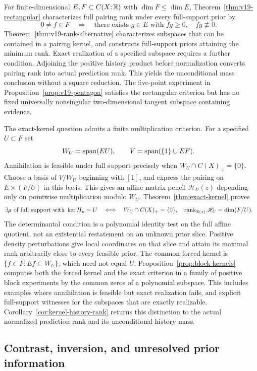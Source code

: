 For finite-dimensional $E,F\subset C(X;\mathbb R)$ with $\dim F\le\dim E$,
Theorem~\ref{thm:v19-rectangular} characterizes full pairing rank
under every full-support prior by
\[
 0\ne f\in F\quad\Longrightarrow\quad
 \text{there exists }g\in E\text{ with }fg\ge0,\quad fg\not\equiv0.
\]
Theorem~\ref{thm:v19-rank-alternative} characterizes subspaces that
can be contained in a pairing kernel, and constructs full-support priors
attaining the minimum rank. Exact realization of a specified subspace
requires a further condition.
Adjoining the positive history product before normalization converts
pairing rank into actual prediction rank. This yields the unconditional
mass conclusion without a square reduction. The five-point experiment
in Proposition~\ref{prop:v19-pentagon} satisfies the rectangular
criterion but has no fixed universally nonsingular two-dimensional
tangent subspace containing evidence.


The exact-kernel question admits a finite multiplication criterion.
For a specified $U\subset F$ set
\[
 W_U=\operatorname{span}(EU),\qquad V=\operatorname{span}(\{1\}\cup EF).
\]
Annihilation is feasible under full support precisely when
$W_U\cap C(X)_+=\{0\}$. Choose a basis of $V/W_U$ beginning with
$[1]$, and express the pairing on $E\times(F/U)$ in this basis. This
gives an affine matrix pencil $\mathscr H_U(z)$ depending only on
pointwise multiplication modulo $W_U$. Theorem~\ref{thm:exact-kernel}
proves
\[
 \exists\mu\text{ of full support with }\ker H_\mu=U
 \quad\Longleftrightarrow\quad
 W_U\cap C(X)_+=\{0\},\quad
 \operatorname{rank}_{\mathbb R(z)}\mathscr H_U=\dim(F/U).
\]
The determinantal condition is a polynomial identity test on the full
affine quotient, not an existential restatement on an unknown prior
slice. Positive density perturbations give local coordinates on that
slice and attain its maximal rank arbitrarily close to every feasible
prior. The common forced kernel is
$\{f\in F:Ef\subset W_U\}$, which need not equal $U$.
Proposition~\ref{prop:block-kernels} computes both the forced kernel
and the exact criterion in a family of positive block experiments by
the common zeros of a polynomial subspace. This includes examples where
annihilation is feasible but exact realization fails, and explicit
full-support witnesses for the subspaces that are exactly realizable.
Corollary~\ref{cor:kernel-history-rank} returns this distinction to the
actual normalized prediction rank and its unconditional history mass.

\subsection{Contrast, inversion, and unresolved prior information}

